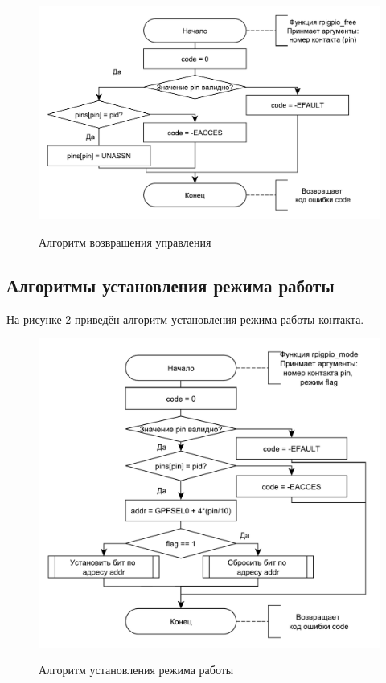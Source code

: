 \begin{figure}[h!] 
	\begin{center}
		{\includegraphics[scale=0.7, angle=0]{img/free.pdf}}
		\caption{Алгоритм возвращения управления}
		\label{alg:free}
	\end{center}
\end{figure}

\subsection{Алгоритмы установления режима работы}
На рисунке \ref{alg:mode} приведён алгоритм установления режима работы контакта.

\begin{figure}[h!] 
	\begin{center}
		{\includegraphics[scale=0.7, angle=0]{img/mode.pdf}}
		\caption{Алгоритм установления режима работы}
		\label{alg:mode}
	\end{center}
\end{figure}

\pagebreak